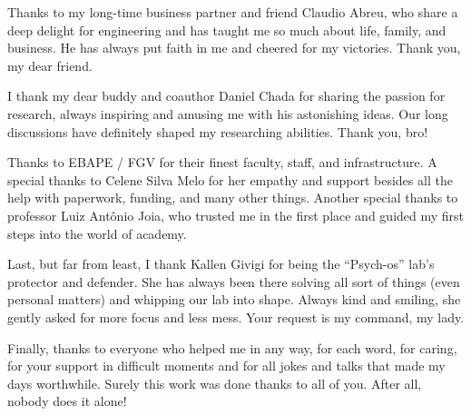 Thanks to my long-time business partner and friend Claudio Abreu, who share a deep delight for engineering and has taught me so much about life, family, and business. He has always put faith in me and cheered for my victories. Thank you, my dear friend.

I thank my dear buddy and coauthor Daniel Chada for sharing the passion for research, always inspiring and amusing me with his astonishing ideas. Our long discussions have definitely shaped my researching abilities. Thank you, bro!

Thanks to EBAPE / FGV for their finest faculty, staff, and infrastructure. A special thanks to Celene Silva Melo for her empathy and support besides all the help with paperwork, funding, and many other things. Another special thanks to professor Luiz Antônio Joia, who trusted me in the first place and guided my first steps into the world of academy.

Last, but far from least, I thank Kallen Givigi for being the ``Psych-os'' lab's protector and defender. She has always been there solving all sort of things (even personal matters) and whipping our lab into shape. Always kind and smiling, she gently asked for more focus and less mess. Your request is my command, my lady.

Finally, thanks to everyone who helped me in any way, for each word, for caring, for your support in difficult moments and for all jokes and talks that made my days worthwhile. Surely this work was done thanks to all of you. After all, nobody does it alone!

\bigskip


\endgroup
